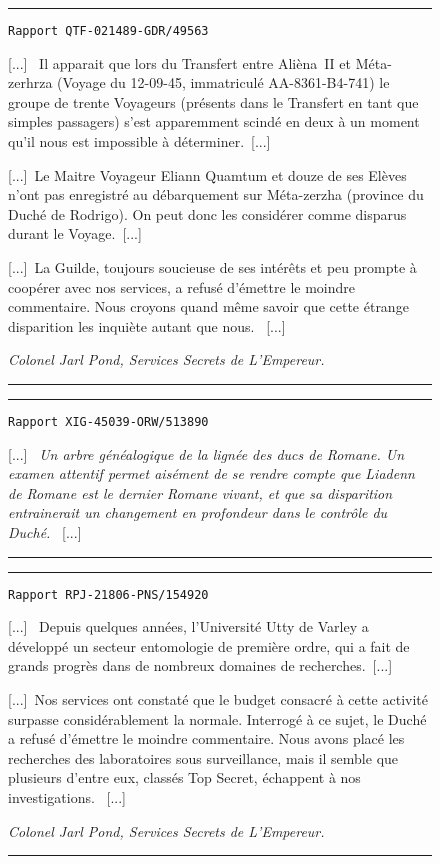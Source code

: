 \documentclass{article}
\newcommand{\indice}[3]{
    \begin{figure}[H]
        \begin{center}
            \rule{0.5\textwidth}{1pt}
        \end{center}
        \begin{framed}
            \begin{samepage}
                \texttt{Rapport #1}
                \nopagebreak

                [...]~#2~[...]

                \nopagebreak
                \hfill\textit{#3}
            \end{samepage}
        \end{framed}
        \caption{}
        \begin{center}
            \rule{0.5\textwidth}{1pt}
        \end{center}
    \end{figure}
}
\begin{document}
\indice
{QTF-021489-GDR/49563}
{
    Il apparait que lors du Transfert entre Alièna~II et Méta-zerhrza (Voyage
    du 12-09-45, immatriculé AA-8361-B4-741) le groupe de trente Voyageurs
    (présents dans le Transfert en tant que simples passagers) s'est
    apparemment scindé en deux à un moment qu'il nous est impossible à
    déterminer.~[...]

    \nobreak

    [...]~Le Maitre Voyageur Eliann Quamtum et douze de ses Elèves n'ont pas
    enregistré au débarquement sur Méta-zerzha (province du Duché de Rodrigo).
    On peut donc les considérer comme disparus durant le Voyage.~[...]

    \nobreak

    [...]~La Guilde, toujours soucieuse de ses intérêts et peu prompte à
    coopérer avec nos services, a refusé d'émettre le moindre commentaire. Nous
    croyons quand même savoir que cette étrange disparition les inquiète autant
    que nous.
}{Colonel Jarl Pond, Services Secrets de L'Empereur.}

\indice
{XIG-45039-ORW/513890}
{
    \textit{Un arbre généalogique de la lignée des ducs de Romane. Un examen 
        attentif permet aisément de se rendre compte que Liadenn de Romane est
        le dernier Romane vivant, et que sa disparition entrainerait un
        changement en profondeur dans le contrôle du Duché.}
}{}

\indice
{RPJ-21806-PNS/154920}
{
    Depuis quelques années, l'Université Utty de Varley a développé un secteur
    \og entomologie\fg{} de première ordre, qui a fait de grands progrès dans
    de nombreux domaines de recherches.~[...]

    \nobreak

    [...]~Nos services ont constaté que le budget consacré à cette activité
    surpasse considérablement la normale. Interrogé à ce sujet, le Duché a
    refusé d'émettre le moindre commentaire. Nous avons placé les recherches
    des laboratoires sous surveillance, mais il semble que plusieurs d'entre
    eux, classés \og Top Secret\fg{}, échappent à nos investigations.
}{Colonel Jarl Pond, Services Secrets de L'Empereur.}
\end{document}
